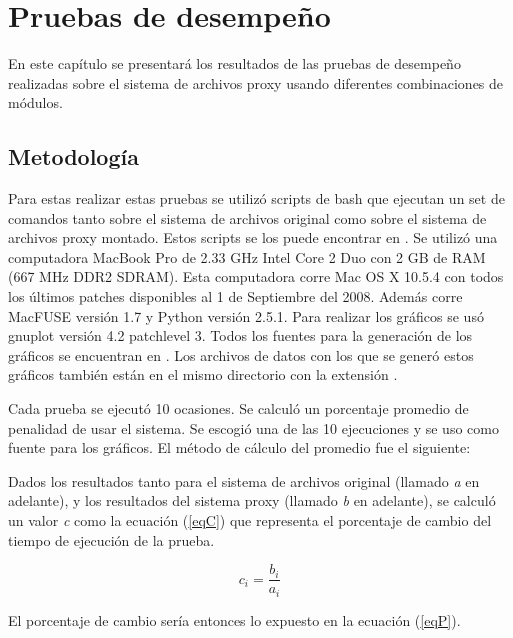 \chapter{Pruebas de desempeño}
\ifpdf
    \graphicspath{{Chapter3/Chapter3Figs/PNG/}{Chapter3/Chapter3Figs/PDF/}{Chapter3/Chapter3Figs/}}
\else
    \graphicspath{{Chapter3/Chapter3Figs/EPS/}{Chapter3/Chapter3Figs/}}
\fi

En este capítulo se presentará los resultados de las pruebas de desempeño realizadas sobre el sistema de archivos proxy usando diferentes combinaciones de módulos.


\section{Metodología}

Para estas realizar estas pruebas se utilizó scripts de bash que ejecutan un set de comandos tanto sobre el sistema de archivos original como sobre el sistema de archivos proxy montado. Estos scripts se los puede encontrar en . Se utilizó una computadora MacBook Pro de 2.33 GHz Intel Core 2 Duo con 2 GB de RAM (667 MHz DDR2 SDRAM). Esta computadora corre Mac OS X 10.5.4 con todos los últimos patches disponibles al 1 de Septiembre del 2008. Además corre MacFUSE versión 1.7 y Python versión 2.5.1. Para realizar los gráficos se usó gnuplot versión 4.2 patchlevel 3. Todos los fuentes para la generación de los gráficos se encuentran en . Los archivos de datos con los que se generó estos gráficos también están en el mismo directorio con la extensión .

Cada prueba se ejecutó 10 ocasiones.  Se calculó un porcentaje promedio de penalidad de usar el sistema. Se escogió una de las 10 ejecuciones y se uso como fuente para los gráficos. El método de cálculo del promedio fue el siguiente:

Dados los resultados tanto para el sistema de archivos original (llamado \textit{a} en adelante), y los resultados del sistema proxy (llamado \textit{b} en adelante), se calculó un valor \textit{c} como la ecuación (\ref{eqC}) que representa el porcentaje de cambio del tiempo de ejecución de la prueba.

\begin{equation}
\label{eqC}
c_{i} = \frac{b_{i}}{a_{i}}
\end{equation}

El porcentaje de cambio sería entonces lo expuesto en la ecuación (\ref{eqP}).

